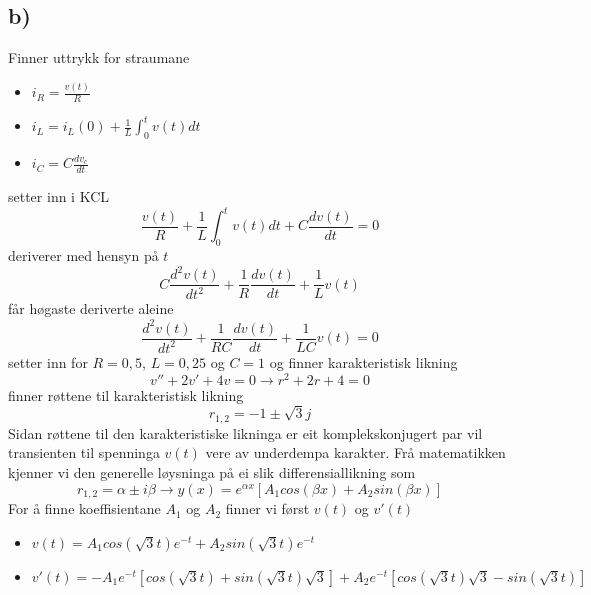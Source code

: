 \documentclass[12pt,a4paper]{article}
\begin{document}
  \subsection*{b)}
    Finner uttrykk for straumane
    \begin{itemize}
      \item $i_R = \frac{v(t)}{R}$
      \item $i_L = i_L(0) + \frac{1}{L}\int_0^t{v(t)dt}$
      \item $i_C = C\frac{dv_c}{dt}$
    \end{itemize}
    setter inn i KCL
    \begin{equation}
      \frac{v(t)}{R} + \frac{1}{L}\int_0^t{v(t)dt} + C\frac{dv(t)}{dt} = 0
    \end{equation}
    deriverer med hensyn på $t$
    \begin{equation}
      C\frac{d^2v(t)}{dt^2} +
      \frac{1}{R}\frac{dv(t)}{dt} +
      \frac{1}{L}v(t)
    \end{equation}
    får høgaste deriverte aleine
    \begin{equation}
      \frac{d^2v(t)}{dt^2} +
      \frac{1}{RC}\frac{dv(t)}{dt} +
      \frac{1}{LC}v(t) = 0
    \end{equation}
    setter inn for $R=0,5$, $L=0,25$ og $C=1$ og finner karakteristisk likning
    \begin{equation}
      v'' + 2v' + 4v = 0 \rightarrow r^2 + 2r + 4 = 0
    \end{equation}
    finner røttene til karakteristisk likning
    \begin{equation}
      r_{1,2} = -1 \pm \sqrt{3}j
    \end{equation}
    Sidan røttene til den karakteristiske likninga er eit komplekskonjugert par vil
    transienten til spenninga $v(t)$ vere av underdempa karakter. Frå matematikken
    kjenner vi den generelle løysninga på ei slik differensiallikning som
    \begin{equation}
      r_{1,2} = \alpha \pm i\beta \rightarrow
      y(x) = e^{\alpha x} \left[ A_1 cos(\beta x) + A_2 sin(\beta x) \right]
    \end{equation}
    For å finne koeffisientane $A_1$ og $A_2$ finner vi først $v(t)$ og $v'(t)$
    \begin{itemize}
      \item $v(t) = A_1 cos(\sqrt{3}t) e^{-t} + A_2 sin(\sqrt{3}t) e^{-t}$
      \item $v'(t) = -A_1 e^{-t} \left[ cos(\sqrt{3}t)+sin(\sqrt{3}t)\sqrt{3} \right] +
        A_2 e^{-t} \left[ cos(\sqrt{3}t)\sqrt{3} - sin(\sqrt{3}t) \right]$
    \end{itemize}
\end{document}
